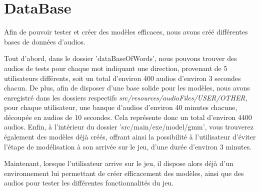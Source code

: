 \section{DataBase}
\label{sec:data_base}

Afin de pouvoir tester et créer des modèles efficaces, nous avons créé différentes bases de données d'audios.

Tout d'abord, dans le dossier 'dataBaseOfWords', nous pouvons trouver des audios de tests pour chaque mot indiquant une direction, provenant de 5 utilisateurs différents, soit un total d'environ 400 audios d'environ 3 secondes chacun.
De plus, afin de disposer d'une base solide pour les modèles, nous avons enregistré dans les dossiers respectifs \textit{src/resources/audioFiles/USER/OTHER}, pour chaque utilisateur, une banque d'audios d'environ 40 minutes chacune, découpée en audios de 10 secondes.
Cela représente donc un total d'environ 4400 audios.
Enfin, à l'intérieur du dossier 'src/main/exe/model/gmm', vous trouverez également des modèles déjà créés, offrant ainsi la possibilité à l'utilisateur d'éviter l'étape de modélisation à son arrivée sur le jeu, d'une durée d'environ 3 minutes.

Maintenant, lorsque l'utilisateur arrive sur le jeu, il dispose alors déjà d'un environnement lui permettant de créer efficacement des modèles, ainsi que des audios pour tester les différentes fonctionnalités du jeu.
